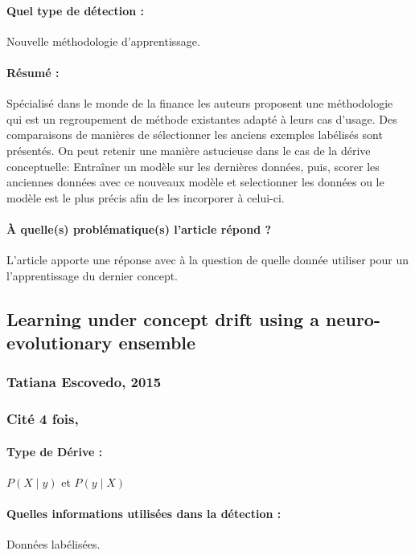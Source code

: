 \documentclass[11pt,a4paper]{report}
\begin{document}
\paragraph{Quel type de détection :} Nouvelle méthodologie d'apprentissage.

\paragraph{Résumé :} Spécialisé dans le monde de la finance les auteurs proposent une méthodologie qui est un regroupement de méthode existantes adapté à leurs cas d'usage. Des comparaisons de manières de sélectionner les anciens exemples labélisés sont présentés. On peut retenir une manière astucieuse dans le cas de la dérive conceptuelle: Entraîner un modèle sur les dernières données, puis, scorer les anciennes données avec ce nouveaux modèle et selectionner les données ou le modèle est le plus précis afin de les incorporer à celui-ci.

\paragraph{À quelle(s) problématique(s) l'article répond ?} L'article apporte une réponse avec à la question de quelle donnée utiliser pour un l'apprentissage du dernier concept.







\subsection{Learning under concept drift using a neuro-evolutionary ensemble}
\subsubsection{Tatiana Escovedo, 2015}

\subsubsection{Cité 4 fois, }

\paragraph{Type de Dérive :} $P(X\mid y)$ et $P(y \mid X)$ 
\paragraph{Quelles informations utilisées dans la détection :} Données labélisées.
\end{document}
